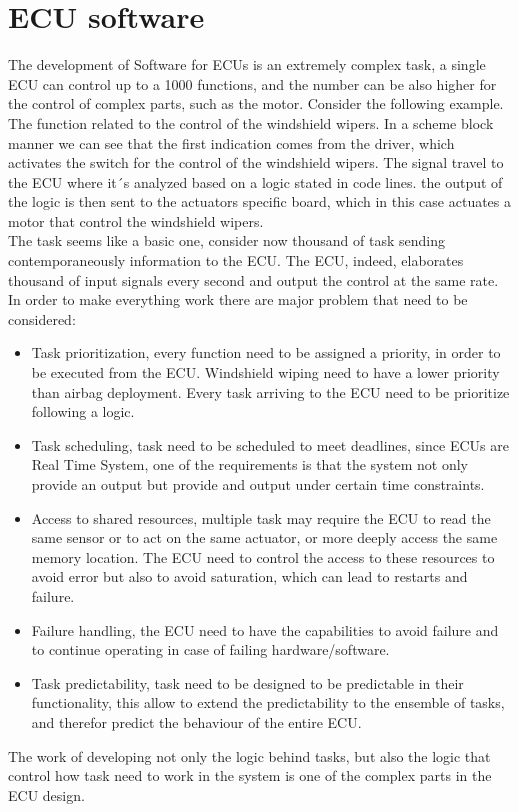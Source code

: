 \documentclass[../main.tex]{subfiles}
\begin{document}
\section{ECU software}
The development of Software for ECUs is an extremely complex task, a single ECU can control up to a 1000 functions, and the number can be also higher for the control of complex parts, such as the motor.
Consider the following example. The function related to the control of the windshield wipers. In a scheme block manner we can see that the first indication comes from the driver, which activates the switch for the control of the windshield wipers. The signal travel to the ECU where it´s analyzed based on a logic stated in code lines. the output of the logic is then sent to the actuators specific board, which in this case actuates a motor that control the windshield wipers.\\
The task seems like a basic one, consider now thousand of task sending contemporaneously information to the ECU. The ECU, indeed,  elaborates thousand of input signals every second and output the control at the same rate. In order to make everything work there are major problem that need to be considered:
\begin{itemize}
    \item Task prioritization, every function need to be assigned a priority, in order to be executed from the ECU. Windshield wiping need to have a lower priority than airbag deployment. Every task arriving to the ECU need to be prioritize following a logic. 
    \item Task scheduling, task need to be scheduled to meet deadlines, since ECUs are Real Time System, one of the requirements is that the system not only provide an output but provide and output under certain time constraints. 
    \item Access to shared resources, multiple task may require the ECU to read the same sensor or to act on the same actuator, or more deeply access the same memory location. The ECU need to control the access to these resources to avoid error but also to avoid saturation, which can lead to restarts and failure.  
    \item Failure handling, the ECU need to have the capabilities to avoid failure and to continue operating in case of failing hardware/software.
    \item Task predictability, task need to be designed to be predictable in their functionality, this allow to extend the predictability to the ensemble of tasks, and therefor predict the behaviour of the entire ECU. 
\end{itemize}
The work of developing not only the logic behind tasks, but also the logic that control how task need to work in the system is one of the complex parts in the ECU design. 
\end{document}
